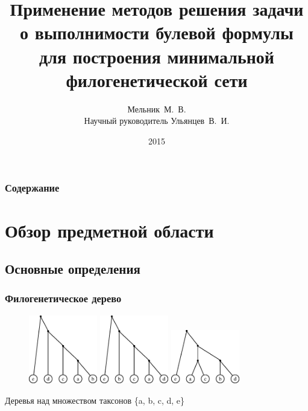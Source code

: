 \documentclass[hyperref={unicode}]{beamer}
\title{Применение методов решения задачи о выполнимости булевой формулы для построения минимальной филогенетической сети}
\author[]{Мельник~М.~В.\\
Научный руководитель Ульянцев~В.~И.}
\institute{Университет~ИТМО}
\date[]{2015}
\begin{document}
\begin{frame}
  \titlepage
\end{frame}

\begin{frame}
\frametitle{Содержание}
	\tableofcontents
\end{frame}

\section{Обзор предметной области}

\subsection{Основные определения}





\begin{frame}
\frametitle{Филогенетическое дерево}

\centering

\begin{figure}[t]
	\includegraphics[width=3cm]{img/inp1.eps}
	\hspace{5mm}
	\includegraphics[width=3cm]{img/inp2.eps}
	\hspace{5mm}
	\includegraphics[width=3cm]{img/inp3.eps}
\end{figure}

Деревья над множеством таксонов \{a, b, c, d, e\}

\end{frame}
\end{document}
